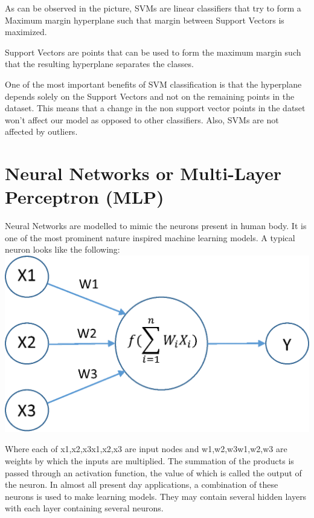 \documentclass[11pt]{article}
\begin{document}
As can be observed in the picture, SVMs are linear classifiers that try to form a Maximum margin hyperplane such that margin between Support Vectors is maximized.

Support Vectors are points that can be used to form the maximum margin such that the resulting hyperplane separates the classes.

One of the most important benefits of SVM classification is that the hyperplane depends solely on the Support Vectors and not on the remaining points in the dataset. This means that a change in the non support vector points in the datset won't affect our model as opposed to other classifiers. Also, SVMs are not affected by outliers.

\section{Neural Networks or Multi-Layer Perceptron (MLP)}

Neural Networks are modelled to mimic the neurons present in human body. It is one of the most prominent nature inspired machine learning models. A typical neuron looks like the following:\\

\noindent \includegraphics[width=\textwidth]{neuron.png}

Where each of x1,x2,x3x1,x2,x3 are input nodes and w1,w2,w3w1,w2,w3 are weights by which the inputs are multiplied. The summation of the products is passed through an activation function, the value of which is called the output of the neuron. In almost all present day applications, a combination of these neurons is used to make learning models. They may contain several hidden layers with each layer containing several neurons.
\end{document}
